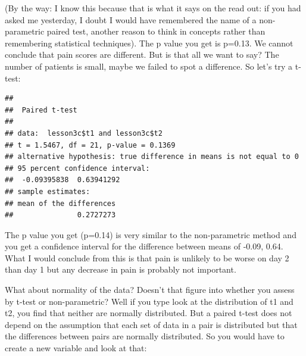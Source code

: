 \documentclass[]{book}
\newenvironment{Shaded}{\begin{snugshade}}{\end{snugshade}}
\newcommand{\DataTypeTok}[1]{\textcolor[rgb]{0.13,0.29,0.53}{#1}}
\newcommand{\KeywordTok}[1]{\textcolor[rgb]{0.13,0.29,0.53}{\textbf{#1}}}
\newcommand{\NormalTok}[1]{#1}
\newcommand{\OperatorTok}[1]{\textcolor[rgb]{0.81,0.36,0.00}{\textbf{#1}}}
\newcommand{\OtherTok}[1]{\textcolor[rgb]{0.56,0.35,0.01}{#1}}
\newcommand{\StringTok}[1]{\textcolor[rgb]{0.31,0.60,0.02}{#1}}
\begin{document}
(By the way: I know this because that is what it says on the read out: if you had asked me yesterday, I doubt I would have remembered the name of a non-parametric paired test, another reason to think in concepts rather than remembering statistical techniques). The p value you get is p=0.13. We cannot conclude that pain scores are different. But is that all we want to say? The number of patients is small, maybe we failed to spot a difference. So let's try a t-test:

\begin{Shaded}
\end{Shaded}

\begin{verbatim}
## 
##  Paired t-test
## 
## data:  lesson3c$t1 and lesson3c$t2
## t = 1.5467, df = 21, p-value = 0.1369
## alternative hypothesis: true difference in means is not equal to 0
## 95 percent confidence interval:
##  -0.09395838  0.63941292
## sample estimates:
## mean of the differences 
##               0.2727273
\end{verbatim}

The p value you get (p=0.14) is very similar to the non-parametric method and you get a confidence interval for the difference between means of -0.09, 0.64. What I would conclude from this is that pain is unlikely to be worse on day 2 than day 1 but any decrease in pain is probably not important.

What about normality of the data? Doesn't that figure into whether you assess by t-test or non-parametric? Well if you type look at the distribution of t1 and t2, you find that neither are normally distributed. But a paired t-test does not depend on the assumption that each set of data in a pair is distributed but that the differences between pairs are normally distributed. So you would have to create a new variable and look at that:

\begin{Shaded}
\end{Shaded}
\end{document}
